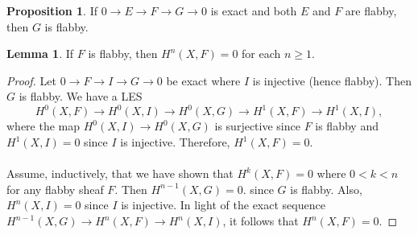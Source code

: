 \documentclass[10pt,letterpaper,cm]{nupset}
\theoremstyle{definition}
\theoremstyle{theorem}
\newtheorem{lemma}[definition]{Lemma}
\newtheorem{prop}[definition]{Proposition}
\theoremstyle{remark}
\newcommand{\1}{\mathbb{1}}
\newcommand{\0}{\vec 0}
\begin{document}
\begin{prop}
If $0 \to E \to F \to G \to 0$ is exact and both $E$ and $F$ are flabby, then $G$ is flabby.
\end{prop}

\begin{lemma}
If $F$ is flabby, then $H^n(X, F) =0$ for each $n\geq 1$.
\end{lemma}
\begin{proof}
 Let $0 \to F \to I \to G \to 0$ be exact where $I$ is injective (hence flabby). Then $G$ is flabby. We have a LES $$ H^0(X, F) \to H^0(X, I) \to H^0(X, G) \to H^1(X, F) \to H^1(X, I)  , $$ where the map $H^0(X, I) \to H^0(X, G)$ is surjective since $F$ is flabby and  $H^1(X, I) =0$ since $I$ is injective. Therefore, $H^1(X, F) =0$.
 \\ \\ Assume, inductively, that we have shown that $H^k(X, F) =0$ where $0 < k <n$ for any flabby sheaf $F$. Then $H^{n-1}(X, G) =0$. since $G$ is flabby. Also, $H^n(X, I) =0$ since $I$ is injective. In light of the exact sequence $H^{n-1}(X, G) \to H^n(X, F) \to H^n(X, I)$, it follows that $H^n(X, F) =0$.
\end{proof}
\end{document}
